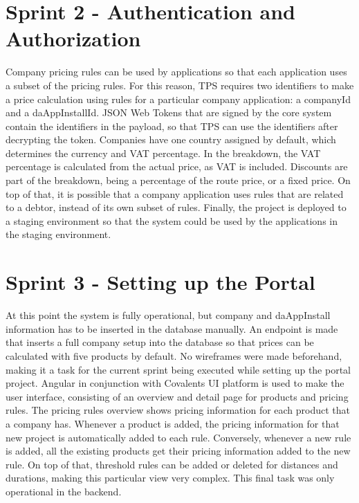%
\section{Sprint 2 - Authentication and Authorization}
Company pricing rules can be used by applications so that each application uses a subset of the pricing rules. For this reason, TPS requires two identifiers to make a price calculation using rules for a particular company application: a companyId and a daAppInstallId. JSON Web Tokens that are signed by the core system contain the identifiers in the payload, so that TPS can use the identifiers after decrypting the token. Companies have one country assigned by default, which determines the currency and VAT percentage. In the breakdown, the VAT percentage is calculated from the actual price, as VAT is included. Discounts are part of the breakdown, being a percentage of the route price, or a fixed price. On top of that, it is possible that a company application uses rules that are related to a debtor, instead of its own subset of rules. Finally, the project is deployed to a staging environment so that the system could be used by the applications in the staging environment.

%
\section{Sprint 3 - Setting up the Portal}
At this point the system is fully operational, but company and daAppInstall information has to be inserted in the database manually. An endpoint is made that inserts a full company setup into the database so that prices can be calculated with five products by default. No wireframes were made beforehand, making it a task for the current sprint being executed while setting up the portal project. Angular in conjunction with Covalents UI platform is used to make the user interface, consisting of an overview and detail page for products and pricing rules. The pricing rules overview shows pricing information for each product that a company has. Whenever a product is added, the pricing information for that new project is automatically added to each rule. Conversely, whenever a new rule is added, all the existing products get their pricing information added to the new rule. On top of that, threshold rules can be added or deleted for distances and durations, making this particular view very complex. This final task was only operational in the backend.

